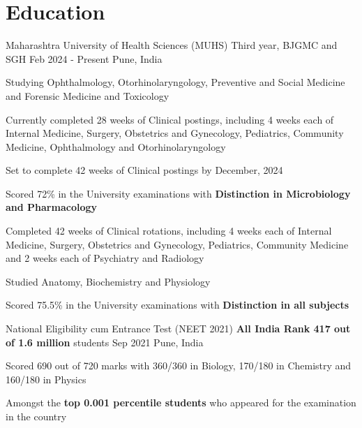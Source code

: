 \section{Education}
\resumeSubHeadingListStart

\resumeExp
{Maharashtra University of Health Sciences (MUHS)}
{Third year, BJGMC and SGH}
{Feb 2024 - Present}
{Pune, India}

\resumeItemListStart
\item[$\bullet$] Studying Ophthalmology, Otorhinolaryngology, Preventive and Social Medicine and Forensic Medicine and Toxicology
\item[$\bullet$] Currently completed 28 weeks of Clinical postings, including 4 weeks each of Internal Medicine, Surgery, Obstetrics and Gynecology, Pediatrics, Community Medicine, Ophthalmology and Otorhinolaryngology
\item[$\bullet$] Set to complete 42 weeks of Clinical postings by December, 2024
\resumeItemListEnd


\resumeItemListStart
\item[$\bullet$] Scored 72\% in the University examinations with \textbf{Distinction in Microbiology and Pharmacology}
\item[$\bullet$] Completed 42 weeks of Clinical rotations, including 4 weeks each of Internal Medicine, Surgery, Obstetrics and Gynecology, Pediatrics, Community Medicine  and 2 weeks each of Psychiatry and Radiology
\resumeItemListEnd


\resumeItemListStart
\item[$\bullet$] Studied Anatomy, Biochemistry and Physiology
\item[$\bullet$] Scored 75.5\% in the University examinations with \textbf{Distinction in all subjects}
\resumeItemListEnd

\resumeExp
{National Eligibility cum Entrance Test (NEET 2021)}
{\textbf{All India Rank 417 out of 1.6 million} students}
{Sep 2021}
{Pune, India}

\resumeItemListStart
		\item[$\bullet$] Scored 690 out of 720 marks with 360/360 in Biology, 170/180 in Chemistry and 160/180 in Physics
        \item[$\bullet$] Amongst the \textbf{top 0.001 percentile students} who appeared for the examination in the country
\resumeItemListEnd

